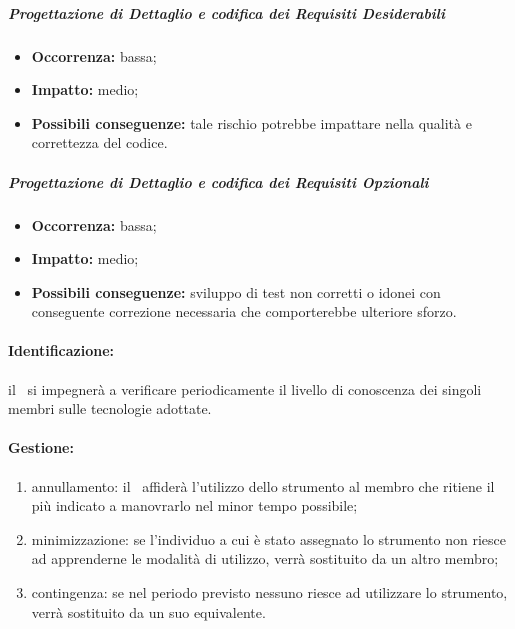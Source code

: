 \documentclass[../PianoProgetto.tex]{subfiles}
\begin{document}
		\subparagraph*{Progettazione di Dettaglio e codifica dei Requisiti Desiderabili}
			\begin{itemize}[label={-}]
				\item \textbf{Occorrenza:} bassa;
				\item \textbf{Impatto:} medio;
				\item \textbf{Possibili conseguenze:} tale rischio potrebbe impattare nella qualità e correttezza del codice.
			\end{itemize}
		\subparagraph*{Progettazione di Dettaglio e codifica dei Requisiti Opzionali}
			\begin{itemize}[label={-}]
				\item \textbf{Occorrenza:} bassa;
				\item \textbf{Impatto:} medio;
				\item \textbf{Possibili conseguenze:} sviluppo di test non corretti o idonei con conseguente correzione necessaria che comporterebbe ulteriore sforzo.
			\end{itemize}
	
	\paragraph*{Identificazione:} il \responsabilediprogetto\ si impegnerà a verificare periodicamente il livello di conoscenza dei singoli membri sulle tecnologie adottate.
	
	\paragraph*{Gestione:}
	\begin{enumerate}
		\item annullamento: il \responsabilediprogetto\ affiderà l'utilizzo dello strumento al membro che ritiene il più indicato a manovrarlo nel minor tempo possibile;
		\item minimizzazione: se l'individuo a cui è stato assegnato lo strumento non riesce ad apprenderne le modalità di utilizzo, verrà sostituito da un altro membro;
		\item contingenza: se nel periodo previsto nessuno riesce ad utilizzare lo strumento, verrà sostituito da un suo equivalente. 
	\end{enumerate}		
	
\end{document}
